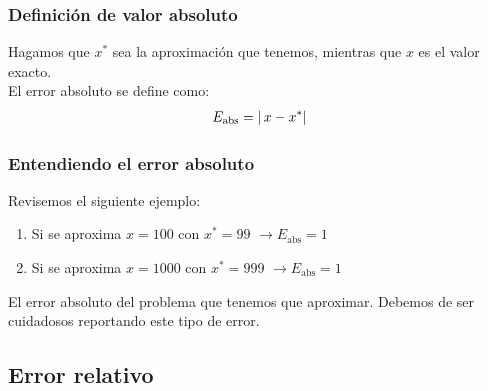 \documentclass[12pt]{beamer}
\begin{document}
\begin{frame}
\frametitle{Definición de valor absoluto}
Hagamos que $x^{*}$ sea la aproximación que tenemos, mientras que $x$ es el valor exacto.
\\
\bigskip
\pause
El error absoluto se define como:
\begin{align*}
E_{\text{abs}} = \abs{ \, x - x^{*}}
\end{align*}
\end{frame}
\begin{frame}
\frametitle{Entendiendo el error absoluto}
Revisemos el siguiente ejemplo:
\begin{enumerate}[<+->]
\item Si se aproxima $x = 100$ con $x^{*} = 99$ \pause $\to E_{\text{abs}} = 1$ \pause
\item Si se aproxima $x = 1000$ con $x^{*} = 999$ \pause $\to E_{\text{abs}} = 1$
\end{enumerate}
\pause
El error absoluto  del problema que tenemos que aproximar. \pause Debemos de ser cuidadosos reportando este tipo de error.
\end{frame}

\subsection{Error relativo}
\end{document}
